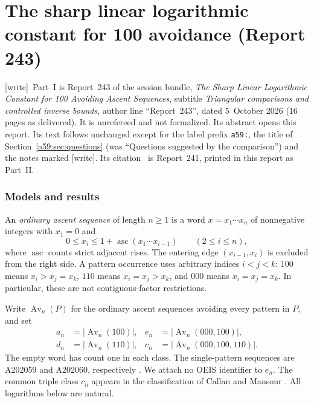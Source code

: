 \documentclass[11pt,letterpaper]{article}
\newcommand{\PartMark}[1]{\InsertMark{a59part}{#1}}
\theoremstyle{remark}\newtheorem{remark}[theorem]{Remark}
\newcommand{\asc}{\operatorname{asc}}\newcommand{\Av}{\operatorname{Av}}\newcommand{\N}{\mathbb N}\newcommand{\E}{\mathbb E}\newcommand{\Prob}{\mathbb P}
\newcommand{\wtag}{\textup{[write]}}
\theoremstyle{remark}\newtheorem{wremark}{Remark}\renewcommand{\thewremark}{W\arabic{wremark}}
\theoremstyle{plain}\newtheorem{wcorollary}[wremark]{Corollary}
\begin{document}
\part{The sharp linear logarithmic constant for 100 avoidance (Report 243)}\label{a59:part}
\PartMark{Part I: Report 243}

\wtag\ Part~I is Report~243 of the session bundle, \emph{The Sharp Linear
Logarithmic Constant for 100 Avoiding Ascent Sequences}, subtitle
\emph{Triangular comparisons and controlled inverse bounds}, author line
``Report~243'', dated 5~October 2026 (16 pages as delivered). It is
unrefereed and not formalized. Its abstract opens this report. Its text
follows unchanged except for the label prefix \texttt{a59:}, the title of
Section~\ref{a59:sec:questions} (was ``Questions suggested by the
comparison'') and the notes marked \wtag. Its citation~\cite{report241} is
Report~241, printed in this report as Part~II.

\section{Models and results}\label{a59:sec:results}
An \emph{ordinary ascent sequence} of length $n\ge1$ is a word $x=x_1\cdots x_n$ of nonnegative integers with $x_1=0$ and
\begin{equation}\label{a59:eq:ascent}
 0\le x_i\le1+\asc(x_1\cdots x_{i-1})\qquad(2\le i\le n),
\end{equation}
where $\asc$ counts strict adjacent rises. The entering edge $(x_{i-1},x_i)$ is excluded from the right side. A pattern occurrence uses arbitrary indices $i<j<k$: $100$ means $x_i>x_j=x_k$, $110$ means $x_i=x_j>x_k$, and $000$ means $x_i=x_j=x_k$. In particular, these are not contiguous-factor restrictions.

Write $\Av_n(P)$ for the ordinary ascent sequences avoiding every pattern in $P$, and set
\begin{align*}
 a_n&=|\Av_n(100)|,&e_n&=|\Av_n(000,100)|,\\
 d_n&=|\Av_n(110)|,&c_n&=|\Av_n(000,100,110)|.
\end{align*}
The empty word has count one in each class. The single-pattern sequences are A202059 and A202060, respectively \cite{conway,oeis100,oeis110}. We attach no OEIS identifier to $e_n$. The common triple class $c_n$ appears in the classification of Callan and Mansour \cite{callan}. All logarithms below are natural.
\end{document}
